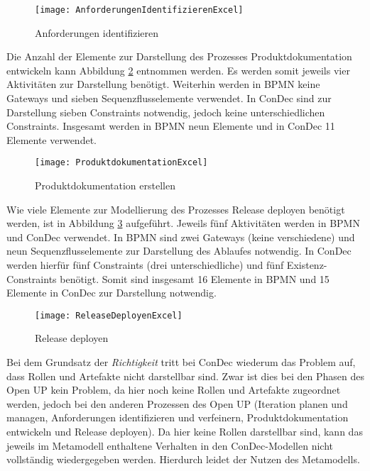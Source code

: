 \begin{figure}[htp]
\begin{center}
  \texttt{[image: AnforderungenIdentifizierenExcel]} %
  \caption{Anforderungen identifizieren}
  \label{fig:AnforderungenIdentifizierenExcel}
\end{center}
\end{figure}

Die Anzahl der Elemente zur Darstellung des Prozesses Produktdokumentation entwickeln kann Abbildung \ref{fig:ProduktdokumentationExcel} entnommen werden. Es werden somit jeweils vier Aktivitäten zur Darstellung benötigt. Weiterhin werden in BPMN keine Gateways und sieben Sequenzflusselemente verwendet. In ConDec sind zur Darstellung sieben Constraints notwendig, jedoch keine unterschiedlichen Constraints. Insgesamt werden in BPMN neun Elemente und in ConDec 11 Elemente verwendet.\newline

\begin{figure}[htp]
\begin{center}
  \texttt{[image: ProduktdokumentationExcel]} %
  \caption{Produktdokumentation erstellen}
  \label{fig:ProduktdokumentationExcel}
\end{center}
\end{figure}

Wie viele Elemente zur Modellierung des Prozesses Release deployen benötigt werden, ist in Abbildung \ref{fig:ReleaseDeployenExcel} aufgeführt. Jeweils fünf Aktivitäten werden in BPMN und ConDec verwendet. In BPMN sind zwei Gateways (keine verschiedene) und neun Sequenzflusselemente zur Darstellung des Ablaufes notwendig. In ConDec werden hierfür fünf Constraints (drei unterschiedliche)  und fünf Existenz-Constraints benötigt. Somit sind insgesamt 16 Elemente in BPMN und 15 Elemente in ConDec zur Darstellung notwendig. \newline
\begin{figure}[htp]
\begin{center}
  \texttt{[image: ReleaseDeployenExcel]} %
  \caption{Release deployen}
  \label{fig:ReleaseDeployenExcel}
\end{center}
\end{figure}

Bei dem Grundsatz der \textit{Richtigkeit} tritt bei ConDec wiederum das Problem auf, dass Rollen und Artefakte nicht darstellbar sind. Zwar ist dies bei den Phasen des Open UP kein Problem, da hier noch keine Rollen und Artefakte zugeordnet werden, jedoch bei den anderen Prozessen des Open UP (Iteration planen und managen, Anforderungen identifizieren und verfeinern, Produktdokumentation entwickeln und Release deployen). Da hier keine Rollen darstellbar sind, kann das jeweils im Metamodell enthaltene Verhalten in den ConDec-Modellen nicht vollständig wiedergegeben werden. Hierdurch leidet der Nutzen des Metamodells. \newline

